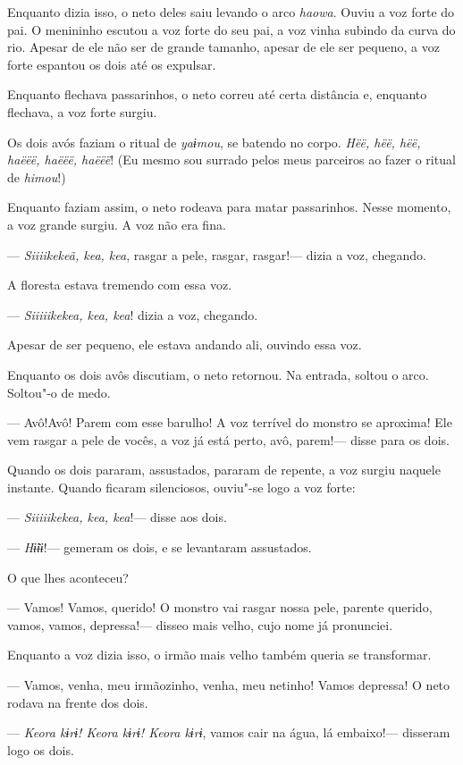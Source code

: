 Enquanto dizia isso, o neto deles saiu levando o arco \emph{haowa}.
Ouviu a voz forte do pai. O menininho escutou a voz forte do seu pai, a
voz vinha subindo da curva do rio. Apesar de ele não ser de grande
tamanho, apesar de ele ser pequeno, a voz forte espantou os dois até os
expulsar. 

Enquanto flechava passarinhos, o neto correu até certa distância e,
enquanto flechava, a voz forte surgiu. 

Os dois avós faziam o ritual de \emph{yaɨmou}, se batendo no
corpo. \emph{Hëë, hëë, hëë, haëëë, haëëë, haëëë}! (Eu mesmo sou surrado
pelos meus parceiros ao fazer o ritual de \emph{himou}!) 

Enquanto faziam assim, o neto rodeava para matar passarinhos. Nesse
momento, a voz grande surgiu. A voz não era fina. 

--- \emph{Siiiikekeã, kea, kea}, rasgar a pele, rasgar, rasgar!--- dizia
a voz, chegando. 

A floresta estava tremendo com essa voz. 

--- \emph{Siiiiikekea, kea, kea}! dizia a voz, chegando. 

Apesar de ser pequeno, ele estava andando ali, ouvindo essa voz. 

Enquanto os dois avôs discutiam, o neto retornou. Na entrada, soltou o
arco. Soltou"-o de medo. 

--- Avô!Avô! Parem com esse barulho! A voz terrível do monstro se
aproxima! Ele vem rasgar a pele de vocês, a voz já está perto, avô,
parem!--- disse para os dois. 

Quando os dois pararam, assustados, pararam de repente, a voz surgiu
naquele instante. Quando ficaram silenciosos, ouviu"-se logo a voz
forte: 

--- \emph{Siiiiikekea, kea, kea}!--- disse aos dois. 

--- \emph{Hɨ̃ɨɨ}!--- gemeram os dois, e se levantaram assustados. 

O que lhes aconteceu?

--- Vamos! Vamos, querido! O monstro vai rasgar nossa pele, parente
querido, vamos, vamos, depressa!--- disseo mais velho, cujo nome já
pronunciei. 

Enquanto a voz dizia isso, o irmão mais velho também queria se
transformar. 

--- Vamos, venha, meu irmãozinho, venha, meu netinho! Vamos depressa! O
neto rodava na frente dos dois. 

--- \emph{Keora kɨrɨ! Keora kɨrɨ! Keora kɨrɨ}, vamos cair na água, lá
embaixo!--- disseram logo os dois. 

